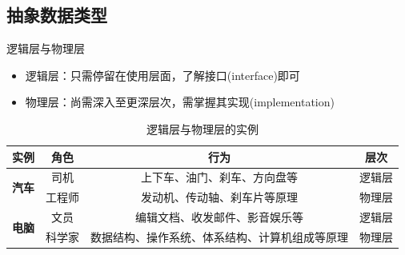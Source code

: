 \subsection{抽象数据类型}

\begin{frame}{\insertsubsectionhead}
	\begin{block}{逻辑层与物理层}
		\begin{itemize}
			\item 逻辑层：只需停留在使用层面，了解\alert{接口(interface)}即可
			\item 物理层：尚需深入至更深层次，需掌握其\alert{实现(implementation)}
		\end{itemize}
	\end{block}
	\pause
	\begin{table}[h]
		\small
		\centering
		\caption{逻辑层与物理层的实例}
		\begin{tabular}{cccc}
			\toprule
			\textbf{实例}                  & \textbf{角色} & \textbf{行为}             & \textbf{层次} \\
			\midrule
			\multirow{2}{*}{\textbf{汽车}} & 司机          & 上下车、油门、刹车、方向盘等          & 逻辑层         \\
			                             & 工程师         & 发动机、传动轴、刹车片等原理          & 物理层         \\
			\midrule
			\multirow{2}{*}{\textbf{电脑}} & 文员          & 编辑文档、收发邮件、影音娱乐等         & 逻辑层         \\
			                             & 科学家         & 数据结构、操作系统、体系结构、计算机组成等原理 & 物理层         \\
			\bottomrule
		\end{tabular}
		\label{tab:log_phy}
	\end{table}
\end{frame}

